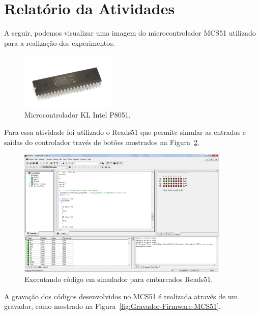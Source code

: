 \documentclass[
	12pt,				%
	openright,			%
  oneside,     %
	a4paper,			%
	english,			%
	french,				%
	spanish,			%
	brazil				%
	]{abntex2}
\begin{document}

\section{Relatório da Atividades} %
\label{sec:Consideracoes-AT89S51}

A seguir, podemos visualizar uma imagem do microcontrolador MCS51 utilizado para a realização dos experimentos.

\begin{figure}[ht]
  \centering
  \caption{\label{fig:Microcontrolador-KL-Intel-P8051}Microcontrolador KL Intel P8051.}  
  \includegraphics[width=0.4\textwidth]{images/Atividade02/Atividade-02-03-Microcontrolador-KL_Intel_P8051.jpg}
\end{figure}

Para essa atividade foi utilizado o Reads51 que permite simular as entradas e saídas do controlador través de botões mostrados na Figura~\ref{fig:Reads51-teste-C}.

\begin{figure}[ht]
  \centering  
  \caption{\label{fig:Reads51-teste-C}Executando código em simulador para embarcados Reads51.} 
  \includegraphics[width=0.9\textwidth]{images/Atividade02/Atividade-02-02-Reads51-teste-c.png} 
\end{figure}

A gravação dos códigos desenvolvidos no MCS51 é realizada através de um gravador, como mostrado na Figura~\ref{fig:Gravador-Firmware-MCS51}.
\end{document}
